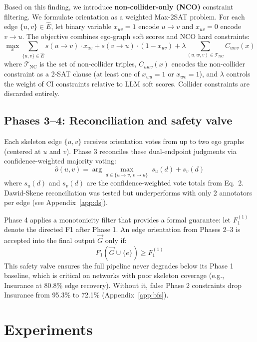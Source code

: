 \documentclass{article}
\begin{document}
Based on this finding, we introduce \textbf{non-collider-only (NCO)} constraint filtering. We formulate orientation as a weighted Max-2SAT problem. For each edge $\{u,v\} \in \hat{E}$, let binary variable $x_{uv} = 1$ encode $u \to v$ and $x_{uv} = 0$ encode $v \to u$. The objective combines ego-graph soft scores and NCO hard constraints:
\begin{equation}
    \max_{x} \sum_{\{u,v\} \in \hat{E}} s(u \to v) \cdot x_{uv} + s(v \to u) \cdot (1 - x_{uv}) + \lambda \sum_{(u,w,v) \in \mathcal{T}_{\text{NC}}} C_{uwv}(x)
\label{eq:maxsat}
\end{equation}
where $\mathcal{T}_{\text{NC}}$ is the set of non-collider triples, $C_{uwv}(x)$ encodes the non-collider constraint as a 2-SAT clause (at least one of $x_{wu} = 1$ or $x_{wv} = 1$), and $\lambda$ controls the weight of CI constraints relative to LLM soft scores. Collider constraints are discarded entirely.

\subsection{Phases 3--4: Reconciliation and safety valve}

Each skeleton edge $\{u, v\}$ receives orientation votes from up to two ego graphs (centered at $u$ and $v$). Phase 3 reconciles these dual-endpoint judgments via confidence-weighted majority voting:
\begin{equation}
    \hat{o}(u,v) = \arg\max_{d \in \{u \to v, \, v \to u\}} \; s_u(d) + s_v(d)
\end{equation}
where $s_u(d)$ and $s_v(d)$ are the confidence-weighted vote totals from Eq.~2. Dawid-Skene reconciliation \citep{dawid1979maximum} was tested but underperforms with only 2 annotators per edge (see Appendix~\ref{app:ds}).

Phase 4 applies a monotonicity filter that provides a formal guarantee: let $F_1^{(1)}$ denote the directed F1 after Phase 1. An edge orientation from Phases 2--3 is accepted into the final output $\vec{G}$ only if:
\begin{equation}
    F_1(\vec{G} \cup \{e\}) \geq F_1^{(1)}
\end{equation}
This safety valve ensures the full pipeline never degrades below its Phase 1 baseline, which is critical on networks with poor skeleton coverage (e.g., Insurance at 80.8\% edge recovery). Without it, false Phase 2 constraints drop Insurance from 95.3\% to 72.1\% (Appendix~\ref{app:bfs}).

\section{Experiments}
\end{document}
